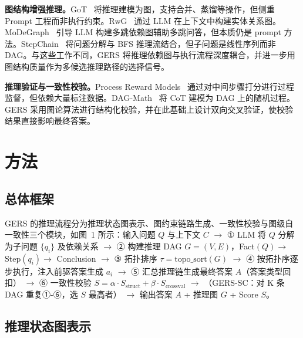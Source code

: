 \documentclass[11pt,a4paper]{ctexart}
\begin{document}
\noindent\textbf{图结构增强推理。}GoT~\cite{besta2024got} 将推理建模为图，支持合并、蒸馏等操作，但侧重 Prompt 工程而非执行约束。RwG~\cite{han2025rwg} 通过 LLM 在上下文中构建实体关系图。MoDeGraph~\cite{oruche2025modegraph} 引导 LLM 构建多跳依赖图辅助多跳问答，但本质仍是 prompt 方法。StepChain~\cite{ni2025stepchain} 将问题分解与 BFS 推理流结合，但子问题是线性序列而非 DAG。与这些工作不同，GERS 将推理依赖图与执行流程深度耦合，并进一步用图结构质量作为多候选推理路径的选择信号。

\noindent\textbf{推理验证与一致性校验。}Process Reward Models~\cite{lightman2024verify} 通过对中间步骤打分进行过程监督，但依赖大量标注数据。DAG-Math~\cite{dagmath2025} 将 CoT 建模为 DAG 上的随机过程。GERS 采用图论算法进行结构化校验，并在此基础上设计双向交叉验证，使校验结果直接影响最终答案。

\section{方法}

\subsection{总体框架}

GERS 的推理流程分为推理状态图表示、图约束链路生成、一致性校验与图级自一致性三个模块，如图~1 所示：输入问题 $Q$ 与上下文 $C$ $\to$ ① LLM 将 $Q$ 分解为子问题 $\{q_i\}$ 及依赖关系 $\to$ ② 构建推理 DAG $G=(V,E)$，Fact$(Q) \to$ Step$(q_i) \to$ Conclusion $\to$ ③ 拓扑排序 $\tau = \text{topo\_sort}(G)$ $\to$ ④ 按拓扑序逐步执行，注入前驱答案生成 $a_i$ $\to$ ⑤ 汇总推理链生成最终答案 $A$（答案类型回扣） $\to$ ⑥ 一致性校验 $S = \alpha \cdot S_{\text{struct}} + \beta \cdot S_{\text{crossval}}$ $\to$ （GERS-SC：对 K 条 DAG 重复①-⑥，选 $S$ 最高者） $\to$ 输出答案 $A$ + 推理图 $G$ + Score $S$。

\begin{figure}[h]
\centering
{}
\end{figure}

\subsection{推理状态图表示}
\end{document}

